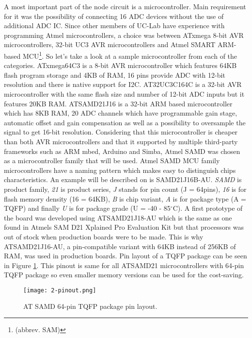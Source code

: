 A most important part of the node circuit is a microcontroller. Main requirement for it was the possibility of connecting 16 \ac{ADC} devices without the use of additional \ac{ADC} \ac{IC}. Since other members of \ac{UC-Lab} have experience with programming Atmel microcontrollers, a choice was between ATxmega 8-bit AVR microcontrollers, 32-bit UC3 AVR microcontrollers and Atmel SMART ARM-based \ac{MCU}\footnote{(abbrev. SAM)}. So let's take a look at a sample microcontroller from each of the categories. ATxmega64C3 is a 8-bit AVR microcontroller which features 64KB flash program storage and 4KB of \ac{RAM}, 16 pins provide \ac{ADC} with 12-bit resolution and there is native support for I2C\cite{ATxmega32C3}. AT32UC3C164C is a 32-bit AVR microcontroller with the same flash size and number of 12-bit \ac{ADC} inputs but it features 20KB \ac{RAM}\cite{AT32uc3}. ATSAMD21J16 is a 32-bit ARM based microcontroller which has 8KB \ac{RAM}, 20 \ac{ADC} channels which have programmable gain stage, automatic offset and gain compensation as well as a possibility to oversample the signal to get 16-bit resolution\cite{ATSAMD}. Considering that this microcontroller is cheaper than both AVR microcontrollers and that it supported by multiple third-party frameworks such as ARM mbed, Arduino and Simba, Atmel SAMD was chosen as a microcontroller family that will be used. Atmel SAMD \ac{MCU} family microcontrollers have a naming pattern which makes easy to distinguish chips characteristics. An example will be described on is SAMD21J16B-AU. \textit{SAMD} is product family, \textit{21} is product series, \textit{J} stands for pin count (J = 64pins), \textit{16} is for flash memory density (16 = 64KB), \textit{B} is chip variant, \textit{A} is for package type (A = \ac{TQFP}) and finally \textit{U} is for package grade (U = -40 - 85$^{\circ}$C). A first prototype of the board was developed using ATSAMD21J18-AU which is the same as one found in Atmels SAM D21 Xplained Pro Evaluation Kit but that processors was out of stock when production boards were to be made. This is why ATSAMD21J16-AU, a pin-compatible variant with 64KB instead of 256KB of RAM, was used in production boards. Pin layout of a \ac{TQFP} package can be seen in Figure \ref{fig:pinout}. This pinout is same for all ATSAMD21 microcontrollers with 64-pin \ac{TQFP} package so even smaller memory versions can be used for the cost-saving. 

\begin{figure}[h]
  \begin{center}
    \texttt{[image: 2-pinout.png]}
  \end{center}
  \caption{AT SAMD 64-pin TQFP package pin layout.}
  \label{fig:pinout}
\end{figure}

